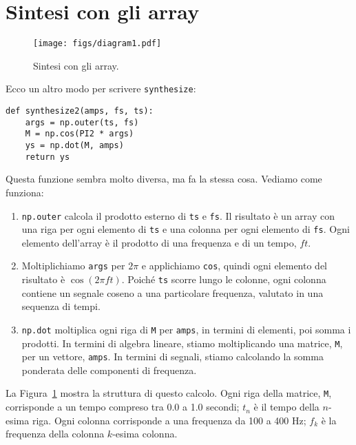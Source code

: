 \documentclass[12pt,a4paper]{book}
\begin{document}
\section{Sintesi con gli array} \label{synthesis} 

\begin{figure} \centerline{\texttt{[image: figs/diagram1.pdf]}} \caption{Sintesi con gli array.} \label{fig.synthesis} \end{figure} 

Ecco un altro modo per scrivere {\tt synthesize}:

\begin{verbatim} 
def synthesize2(amps, fs, ts):
    args = np.outer(ts, fs)
    M = np.cos(PI2 * args)
    ys = np.dot(M, amps)
    return ys
 \end{verbatim} 

Questa funzione sembra molto diversa, ma fa la stessa cosa. Vediamo come funziona:

\begin{enumerate} 

\item {\tt np.outer} calcola il prodotto esterno di {\tt ts} e {\tt fs}. Il risultato è un array con una riga per ogni elemento di {\tt ts} e una colonna per ogni elemento di {\tt fs}. Ogni elemento dell'array è il prodotto di una frequenza e di un tempo, $f t$.

\item Moltiplichiamo {\tt args} per $2 \pi$ e applichiamo {\tt cos}, quindi ogni elemento del risultato è $\cos (2 \pi f t)$. Poiché {\tt ts} scorre lungo le colonne, ogni colonna contiene un segnale coseno a una particolare frequenza, valutato in una sequenza di tempi.

\item {\tt np.dot} moltiplica ogni riga di {\tt M} per {\tt amps}, in termini di elementi, poi somma i prodotti. In termini di algebra lineare, stiamo moltiplicando una matrice, {\tt M}, per un vettore, {\tt amps}. In termini di segnali, stiamo calcolando la somma ponderata delle componenti di frequenza.

\end{enumerate} 

La Figura~\ref{fig.synthesis} mostra la struttura di questo calcolo. Ogni riga della matrice, {\tt M}, corrisponde a un tempo compreso tra 0.0 a 1.0 secondi; $t_n$ è il tempo della $n$-esima riga. Ogni colonna corrisponde a una frequenza da 100 a 400 Hz; $f_k$ è la frequenza della colonna $k$-esima colonna.
\end{document}
